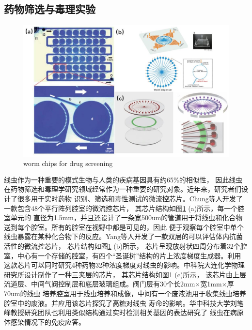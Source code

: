 \subsection{药物筛选与毒理实验}
\label{sec:intro:analog}
	\begin{figure}[b]
	  \centering
	  \includegraphics[width=12cm]{figure/chap1/screen.jpg}
		{worm chips for drug screening}
	  \label{fig:screening}
	\end{figure}
	线虫作为一种重要的模式生物与人类的疾病基因具有约65\%的相似性\cite{Baumeister2002The,Sonnhammer1997Analysis}，
	因此线虫在药物筛选和毒理学研究领域经常作为一种重要的研究对象。近年来，研究者们设计了很多用于实时药物
	识别、筛选和毒性测试的微流控芯片。Chung等人\cite{Chung2011Microfluidic}开发了一款包含48个平行阵列腔室的微流控芯片，
	其芯片结构如图\ref{fig:screening} (a)所示，每一个腔室单元的
	直径为1.5mm，并且还设计了一条宽500um的管道用于将线虫和化合物送到每个腔室。所有的腔室在视野中都是可见的，因此
	便于观察每个腔室中单个线虫暴露在某种化合物下的反应。Yang等人\cite{Yang2013An}开发了一款双层的可以评估体内抗菌活性的微流控芯片，
	芯片结构如图\ref{fig:screening} (b)所示，
	芯片呈现放射状四周分布着32个腔室，中心有一个存储的腔室，有四个“圣诞树”结构的片上浓度梯度生成器\cite{Dertinger2001Generation,Jeon2000Generation}。利用
	这款芯片可以同时研究4种药物32种浓度梯度对线虫的影响。中科院大连化学物理研究所设计制作了一种三夹层的芯片，
	其芯片结构如图\ref{fig:screening} (c)所示，
	该芯片由上层流道层、中间气阀控制层和底层玻璃组成。阀门层有30个长2mm$\times$宽1mm$\times$厚70um的线虫
	培养腔室用于线虫培养和成像，中间有一个废液池用于收集线虫培养腔室中的废液。并应用该芯片探究了高糖对线虫
	寿命的影响\cite{zhuliguo2016}。华中科技大学刘笔峰教授研究团队也利用类似结构通过实时检测相关基因的表达研究了
	线虫在病原体感染情况下的免疫应答\cite{hu2018real}。

